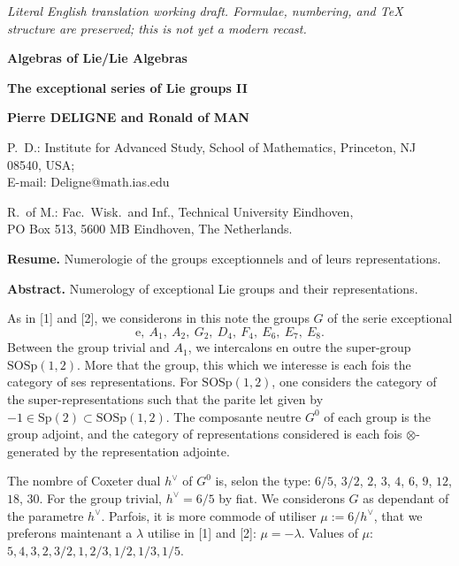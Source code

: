 \documentclass[11pt,a4paper]{article}
\theoremstyle{plain}
\theoremstyle{definition}
\begin{document}
\begin{center}\small\emph{Literal English translation working draft. Formulae, numbering, and TeX structure are preserved; this is not yet a modern recast.}\end{center}
\vspace{0.5em}


\noindent\textbf{Algebras of Lie/Lie Algebras}

\begin{center}
\Large\textbf{The exceptional series of Lie groups II}
\end{center}

\begin{center}
\textbf{Pierre DELIGNE and Ronald of MAN}
\end{center}

\noindent P.~D.: Institute for Advanced Study, School of Mathematics, Princeton, NJ 08540, USA;\\
E-mail: Deligne@math.ias.edu

\medskip
\noindent R.~of M.: Fac.\ Wisk.\ and Inf., Technical University Eindhoven,\\
PO Box 513, 5600 MB Eindhoven, The Netherlands.

\medskip
\noindent\textbf{Resume.} Numerologie of the groups exceptionnels and of leurs representations.

\medskip
\noindent\textbf{Abstract.} Numerology of exceptional Lie groups and their representations.

\bigskip

As in [1] and [2], we considerons in this note the groups $G$ of the serie exceptional
\[
\text{e},\ A_1,\ A_2,\ G_2,\ D_4,\ F_4,\ E_6,\ E_7,\ E_8.
\]
Between the group trivial and $A_1$, we intercalons en outre the super-group $\mathrm{SOSp}(1,2)$. More that the group, this which we interesse is each fois the category of ses representations. For $\mathrm{SOSp}(1,2)$, one considers the category of the super-representations such that the parite let given by $-1 \in \mathrm{Sp}(2) \subset \mathrm{SOSp}(1,2)$. The composante neutre $G^0$ of each group is the group adjoint, and the category of representations considered is each fois $\otimes$-generated by the representation adjointe.

The nombre of Coxeter dual $h^\vee$ of $G^0$ is, selon the type: $6/5$, $3/2$, $2$, $3$, $4$, $6$, $9$, $12$, $18$, $30$. For the group trivial, $h^\vee = 6/5$ by fiat. We considerons $G$ as dependant of the parametre $h^\vee$. Parfois, it is more commode of utiliser $\mu := 6/h^\vee$, that we preferons maintenant a $\lambda$ utilise in [1] and [2]: $\mu = -\lambda$. Values of $\mu$: $5, 4, 3, 2, 3/2, 1, 2/3, 1/2, 1/3, 1/5$.
\end{document}
